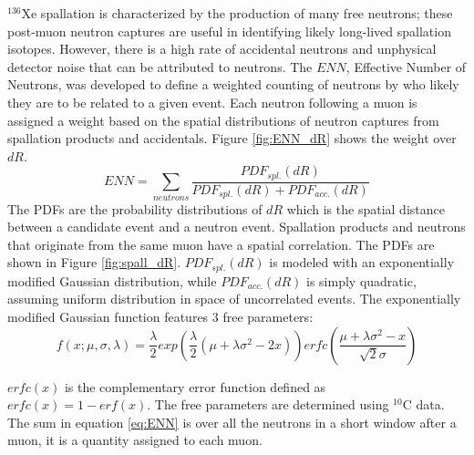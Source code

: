 $^{136}$Xe spallation is characterized by the production of many free neutrons; these post-muon neutron captures are useful in identifying likely long-lived spallation isotopes. However, there is a high rate of accidental neutrons and unphysical detector noise that can be attributed to neutrons. The $ENN$, Effective Number of Neutrons, was developed to define a weighted counting of neutrons by who likely they are to be related to a given event. Each neutron following a muon is assigned a weight based on the spatial distributions of neutron captures from spallation products and accidentals. Figure \ref{fig:ENN_dR} shows the weight over $dR$.
\begin{equation}
	\label{eq:ENN}
	ENN = \sum_{neutrons}\frac{PDF_{spl.}(dR)}{PDF_{spl.}(dR)+PDF_{acc.}(dR)}
\end{equation}
The PDFs are the probability distributions of $dR$ which is the spatial distance between a candidate event and a neutron event. Spallation products and neutrons that originate from the same muon have a spatial correlation. The PDFs are shown in Figure \ref{fig:spall_dR}. $PDF_{spl.}(dR)$ is modeled with an exponentially modified Gaussian distribution, while $PDF_{acc.}(dR)$ is simply quadratic, assuming uniform distribution in space of uncorrelated events. The exponentially modified Gaussian function features 3 free parameters:
\begin{equation}
	f(x;\mu,\sigma,\lambda)=\frac{\lambda}{2}exp\left(\frac{\lambda}{2}(\mu+\lambda\sigma^2-2x)\right)erfc\left(\frac{\mu+\lambda\sigma^2-x}{\sqrt{2}\sigma}\right)
\end{equation}

$erfc(x)$ is the complementary error function defined as $erfc(x)=1-erf(x)$. The free parameters are determined using $^{10}$C data. The sum in equation \ref{eq:ENN} is over all the neutrons in a short window after a muon, it is a quantity assigned to each muon.

